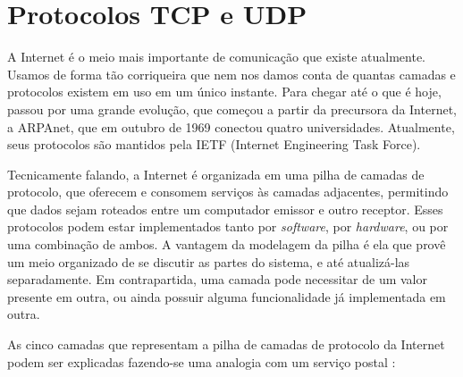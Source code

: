
\section{Protocolos TCP e UDP}

A Internet é o meio mais importante de comunicação que existe atualmente. Usamos de
forma tão corriqueira que nem nos damos conta de quantas camadas e protocolos existem em
uso em um único instante. Para chegar até o que é hoje, passou por uma grande evolução,
que começou a partir da precursora da Internet, a ARPAnet, que em outubro de 1969
\cite{book:kurose} conectou quatro universidades. Atualmente, seus protocolos são mantidos
pela IETF (Internet Engineering Task Force).

Tecnicamente falando, a Internet é organizada em uma pilha de camadas de protocolo, que
oferecem e consomem serviços às camadas adjacentes, permitindo que dados sejam roteados
entre um computador emissor e outro receptor. Esses protocolos podem estar implementados
tanto por \emph{software}, por \emph{hardware}, ou por uma combinação de ambos. A
vantagem da modelagem da pilha é ela que provê um meio organizado de se discutir as
partes do sistema, e até atualizá-las separadamente. Em contrapartida, uma camada pode
necessitar de um valor presente em outra, ou ainda possuir alguma funcionalidade já
implementada em outra.

As cinco camadas que representam a pilha de camadas de protocolo da Internet podem ser
explicadas fazendo-se uma analogia com um serviço postal \cite{site:internet-layer}:

